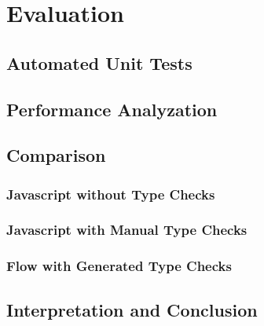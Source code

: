 
\chapter{Evaluation}
\label{cha:evaluation}

\section{Automated Unit Tests}
\label{sec:automated_unit_tests}

\section{Performance Analyzation}
\label{sec:performance_analyzation}

\section{Comparison}
\label{sec:comparison}

\subsection{Javascript without Type Checks}
\label{sec:avascript_without_type_checks}

\subsection{Javascript with Manual Type Checks}
\label{sec:javascript_with_manual_type_checks}

\subsection{Flow with Generated Type Checks}
\label{sec:flow_with_generated_type_checks}

\section{Interpretation and Conclusion}
\label{sec:interpretation_conclusion}
